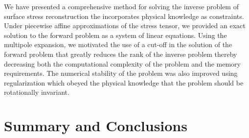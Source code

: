 \documentclass[aps,prl,reprint,twocolumn,groupedaddress,showpacs]{revtex4-1}
\begin{document}
We have presented a comprehensive method for solving the inverse problem of surface stress
reconstruction the incorporates physical knowledge as constraints.  Under piecewise affine approximations
of the stress tensor, we provided an exact solution to the forward problem as a system of
linear equations. Using the multipole expansion, we motivated the use of a cut-off in the solution of the forward problem that greatly reduces the rank of the inverse problem thereby decreasing both
the computational complexity of the problem and the memory requirements. The numerical stability
of the problem was also improved using regularization which obeyed the physical knowledge that
the problem should be rotationally invariant.

\section{Summary and Conclusions}



\appendix
\end{document}
